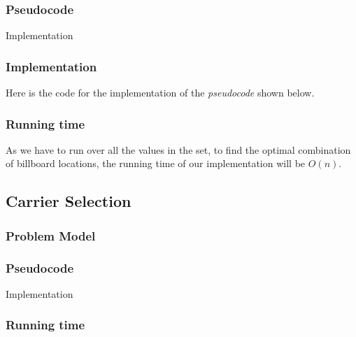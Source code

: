 \documentclass{article}
\begin{document}
\subsubsection*{Pseudocode}

\begin{algorithm}[H]
\caption{Implementation}
\begin{algorithmic}[1]
\end{algorithmic}
\end{algorithm}

\subsubsection*{Implementation}

Here is the code for the implementation of the \textit{pseudocode} shown below.



\subsubsection*{Running time}
As we have to run over all the values in the set, to find the optimal combination of billboard locations, the running time of our implementation will be $O(n)$.


\subsection*{Carrier Selection}

\subsubsection*{Problem Model}

\subsubsection*{Pseudocode}

\begin{algorithm}[H]
\caption{Implementation}
\begin{algorithmic}[1]
\end{algorithmic}
\end{algorithm}

\subsubsection*{Running time}
\end{document}
